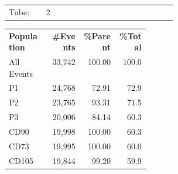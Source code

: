 \documentclass[UTF8,10pt,a4paper,fontset=fandol]{ctexart}
\newcommand{\fieldvalue}[1]{#1}
\begin{document}
\bigskip

\noindent
\begin{tabular}{p{0.17\linewidth}p{0.60\linewidth}}
Tube: &
\fieldvalue{2}
\end{tabular}

\smallskip

\noindent
\begin{tabular}{p{0.28\linewidth}rrr}
\textbf{Population} & \textbf{\#Events} & \textbf{\%Parent} & \textbf{\%Total}\\
\fieldvalue{All Events} &
\fieldvalue{33,742} &
\fieldvalue{100.00} &
\fieldvalue{100.0}
\\
\hspace{0.15cm}
\fieldvalue{P1} &
\fieldvalue{24,768} &
\fieldvalue{72.91} &
\fieldvalue{72.9}
\\
\hspace{0.30cm}
\fieldvalue{P2} &
\fieldvalue{23,765} &
\fieldvalue{93.31} &
\fieldvalue{71.5}
\\
\hspace{0.45cm}
\fieldvalue{P3} &
\fieldvalue{20,006} &
\fieldvalue{84.14} &
\fieldvalue{60.3}
\\
\hspace{0.60cm}
\fieldvalue{CD90} &
\fieldvalue{19,998} &
\fieldvalue{100.00} &
\fieldvalue{60.3}
\\
\hspace{0.60cm}
\fieldvalue{CD73} &
\fieldvalue{19,995} &
\fieldvalue{100.00} &
\fieldvalue{60.0}
\\
\hspace{0.60cm}
\fieldvalue{CD105} &
\fieldvalue{19,844} &
\fieldvalue{99.20} &
\fieldvalue{59.9}
\end{tabular}
\end{document}
